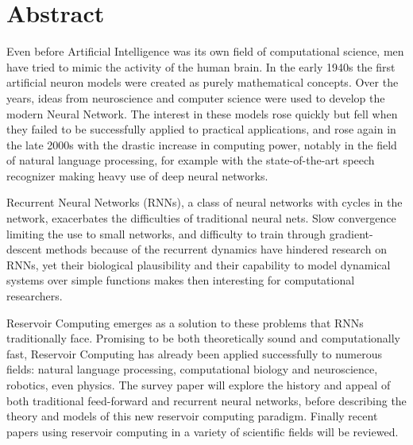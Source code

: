 \documentclass[
10pt, %
a4paper, %
oneside, %
headinclude,footinclude, %
BCOR5mm, %
]{scrartcl}
\begin{document}
\section*{Abstract} %
Even before Artificial Intelligence was its own field of computational science, men have tried to mimic the activity of the human brain. In the early 1940s the first artificial neuron models were created as purely mathematical concepts. Over the years, ideas from neuroscience and computer science were used to develop the modern Neural Network. The interest in these models rose quickly but fell when they failed to be successfully applied to practical applications, and rose again in the late 2000s with the drastic increase in computing power, notably in the field of natural language processing, for example with the state-of-the-art speech recognizer making heavy use of deep neural networks.

Recurrent Neural Networks (RNNs), a class of neural networks with cycles in the network, exacerbates the difficulties of traditional neural nets. Slow convergence limiting the use to small networks, and difficulty to train through gradient-descent methods because of the recurrent dynamics have hindered research on RNNs, yet their biological plausibility and their capability to model dynamical systems over simple functions makes then interesting for computational researchers. 

Reservoir Computing emerges as a solution to these problems that RNNs traditionally face. Promising to be both theoretically sound and computationally fast, Reservoir Computing has already been applied successfully to numerous fields: natural language processing, computational biology and neuroscience, robotics, even physics. The survey paper will explore the history and appeal of both traditional feed-forward and recurrent neural networks, before describing the theory and models of this new reservoir computing paradigm. Finally recent papers using reservoir computing in a variety of scientific fields will be reviewed.


{\let\thefootnote\relax{}}
\end{document}
